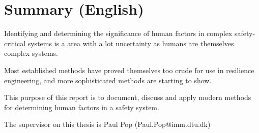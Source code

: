 \chapter{Summary (English)}
Identifying and determining the significance of human factors in complex safety-critical systems is a area with a lot uncertainty as humans are themselves complex systems.

Most established methods have proved themselves too crude for use in resilience engineering, and more sophisticated methods are starting to show.

This purpose of this report is to document, discuss and apply modern methods for determining human factors in a safety system.


The supervisor on this thesis is Paul Pop (Paul.Pop@imm.dtu.dk)